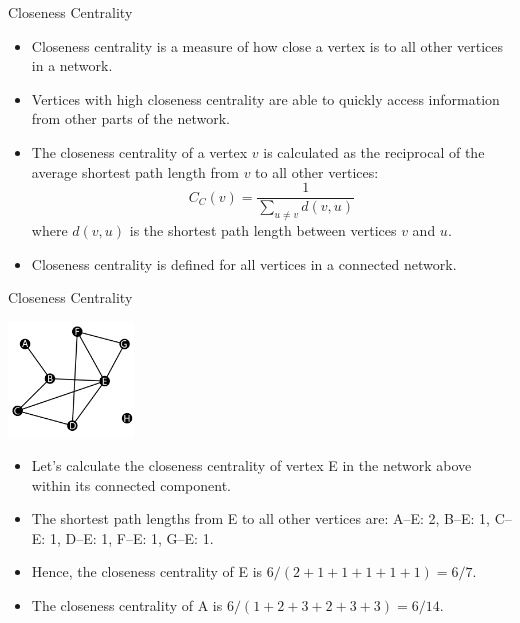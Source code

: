 \documentclass[9pt,handout]{beamer}
\let\olditem\item
\renewcommand{\item}{\olditem\vfill}
\begin{document}
\begin{frame}{Closeness Centrality}
  \begin{itemize}
    \item Closeness centrality is a measure of how close a vertex is to all other vertices in a network.
    \item Vertices with high closeness centrality are able to quickly access information from other parts of the network.
    \item The closeness centrality of a vertex $v$ is calculated as the reciprocal of the average shortest path length from $v$ to all other vertices:
    \[
    C_C(v) = \frac{1}{\sum_{u \neq v} d(v,u)}
    \]
    where $d(v,u)$ is the shortest path length between vertices $v$ and $u$.
    \item Closeness centrality is defined for all vertices in a connected network.
  \end{itemize}
\end{frame}

\begin{frame}{Closeness Centrality}
  \begin{center}
    \includegraphics[width=0.25\textwidth]{week_02_lecture_img_01}
  \end{center}    
  \begin{itemize}
    \item Let's calculate the closeness centrality of vertex E in the network above within its connected component.
    \item The shortest path lengths from E to all other vertices are: A--E: 2, B--E: 1, C--E: 1, D--E: 1, F--E: 1, G--E: 1.
    \item Hence, the closeness centrality of E is $6/(2+1+1+1+1+1)=6/7$.  
    \item The closeness centrality of A is $6/(1+2+3+2+3+3)=6/14$. 
  \end{itemize}
\end{frame}
\end{document}
